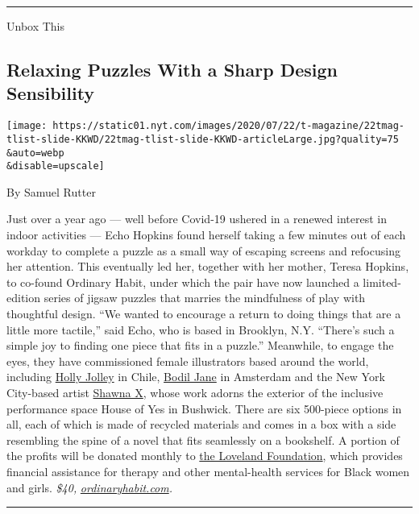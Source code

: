 \begin{center}\rule{0.5\linewidth}{\linethickness}\end{center}

Unbox This

\hypertarget{relaxing-puzzles-with-a-sharp-design-sensibility}{%
\subsection{Relaxing Puzzles With a Sharp Design
Sensibility}\label{relaxing-puzzles-with-a-sharp-design-sensibility}}

\texttt{[image: https://static01.nyt.com/images/2020/07/22/t-magazine/22tmag-tlist-slide-KKWD/22tmag-tlist-slide-KKWD-articleLarge.jpg?quality=75\\\&auto=webp\\\&disable=upscale]}

By Samuel Rutter

Just over a year ago --- well before Covid-19 ushered in a renewed
interest in indoor activities --- Echo Hopkins found herself taking a
few minutes out of each workday to complete a puzzle as a small way of
escaping screens and refocusing her attention. This eventually led her,
together with her mother, Teresa Hopkins, to co-found Ordinary Habit,
under which the pair have now launched a limited-edition series of
jigsaw puzzles that marries the mindfulness of play with thoughtful
design. ``We wanted to encourage a return to doing things that are a
little more tactile,'' said Echo, who is based in Brooklyn, N.Y.
``There's such a simple joy to finding one piece that fits in a
puzzle.'' Meanwhile, to engage the eyes, they have commissioned female
illustrators based around the world, including
\href{https://www.instagram.com/holly_jolley_/?hl=en}{Holly Jolley} in
Chile, \href{https://www.instagram.com/bodiljane/?hl=en}{Bodil Jane} in
Amsterdam and the New York City-based artist
\href{https://www.instagram.com/shawnax/?hl=en}{Shawna X}, whose work
adorns the exterior of the inclusive performance space House of Yes in
Bushwick. There are six 500-piece options in all, each of which is made
of recycled materials and comes in a box with a side resembling the
spine of a novel that fits seamlessly on a bookshelf. A portion of the
profits will be donated monthly to
\href{https://thelovelandfoundation.org/}{the Loveland Foundation},
which provides financial assistance for therapy and other mental-health
services for Black women and girls. \emph{\$40,}
\href{http://ordinaryhabit.com/}{\emph{ordinaryhabit.com}}\emph{.}

\begin{center}\rule{0.5\linewidth}{\linethickness}\end{center}

